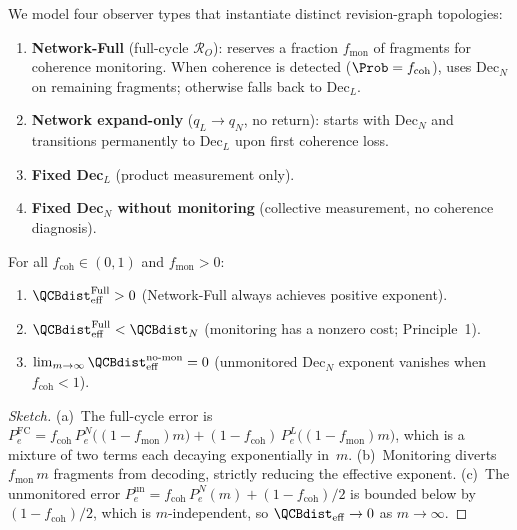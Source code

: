 We model four observer types that instantiate distinct revision-graph topologies:
\begin{enumerate}[nosep]
  \item \textbf{Network-Full} (full-cycle $\mathcal{R}_O$):
    reserves a fraction $f_{\mathrm{mon}}$ of fragments for coherence monitoring.
    When coherence is detected ($\Prob = f_{\mathrm{coh}}$), uses Dec$_N$ on
    remaining fragments; otherwise falls back to Dec$_L$.
  \item \textbf{Network expand-only} ($q_L \to q_N$, no return):
    starts with Dec$_N$ and transitions permanently to Dec$_L$ upon first
    coherence loss.
  \item \textbf{Fixed Dec$_L$} (product measurement only).
  \item \textbf{Fixed Dec$_N$ without monitoring} (collective measurement,
    no coherence diagnosis).
\end{enumerate}

\begin{proposition}
\label{prop:redundancy_ordering}
For all $f_{\mathrm{coh}} \in (0,1)$ and $f_{\mathrm{mon}} > 0$:
\begin{enumerate}[nosep,label=(\alph*)]
  \item $\QCBdist_{\mathrm{eff}}^{\mathrm{Full}} > 0$\; (Network-Full always
    achieves positive exponent).
  \item $\QCBdist_{\mathrm{eff}}^{\mathrm{Full}} <
    \QCBdist_N$\; (monitoring has a nonzero cost; Principle~1).
  \item $\lim_{m\to\infty}\QCBdist_{\mathrm{eff}}^{\mathrm{no\text{-}mon}}
    = 0$\; (unmonitored Dec$_N$ exponent vanishes when $f_{\mathrm{coh}}<1$).
\end{enumerate}
\end{proposition}

\begin{proof}[Sketch]
(a)~The full-cycle error is
$P_e^{\mathrm{FC}} = f_{\mathrm{coh}}\,P_e^N\bigl((1{-}f_{\mathrm{mon}})m\bigr)
  + (1{-}f_{\mathrm{coh}})\,P_e^L\bigl((1{-}f_{\mathrm{mon}})m\bigr)$,
which is a mixture of two terms each decaying exponentially in~$m$.
(b)~Monitoring diverts $f_{\mathrm{mon}}\,m$ fragments from decoding,
strictly reducing the effective exponent.
(c)~The unmonitored error
$P_e^{\mathrm{un}} = f_{\mathrm{coh}}\,P_e^N(m) + (1{-}f_{\mathrm{coh}})/2$
is bounded below by $(1{-}f_{\mathrm{coh}})/2$, which is $m$-independent,
so $\QCBdist_{\mathrm{eff}} \to 0$ as $m\to\infty$.
\end{proof}

